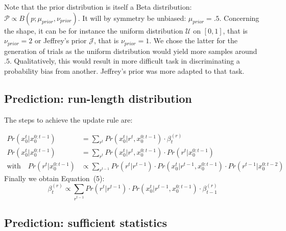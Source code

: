 \documentclass[10pt,letterpaper]{article}
\newcommand{\eq}[1]{\begin{equation*}#1\end{equation*}}
\newcommand{\eqs}[1]{\begin{align*}#1\end{align*}}
\newcommand{\Jj}{\mathcal{J}}
\newcommand{\Pp}{\mathcal{P}}
\newcommand{\Uu}{\mathcal{U}}
\newcommand{\seeEq}[1]{Equation~\ref{eq:#1}}
\begin{document}
%
%

%
%



Note that the prior distribution is itself a Beta distribution:
$\Pp\propto B(p; \mu_{prior}, \nu_{prior})$.
It will by symmetry be unbiased: $\mu_{prior}=.5$.
Concerning the shape, it can be for instance
the uniform distribution $\Uu$ on $ [ 0, 1 ] $, that is $\nu_{prior}=2$ or
Jeffrey's prior $\Jj$, that is $\nu_{prior}=1$.
We chose the latter for the generation of trials
as the uniform distribution would yield more samples around $.5$.
Qualitatively, this would result in more difficult task in discriminating a probability bias from another.
Jeffrey's prior was more adapted to that task.


\subsection{Prediction: run-length distribution}

The steps to achieve the update rule are:

 \eqs{
Pr(x_0^t | x_0^{0:t-1}) &= \sum_{r^{t}} Pr(x_0^t | r^{t}, x_0^{0:t-1}) \cdot  \beta^{(r)}_t \\
Pr(x_0^t | x_0^{0:t-1}) &= \sum_{r^{t}} Pr(x_0^t | r^{t}, x_0^{0:t-1}) \cdot  Pr(r^{t} | x_0^{0:t-1})\\
\text{with} \quad Pr(r^{t} | x_0^{0:t-1}) &\propto \sum_{r^{t-1}}  Pr(r^t | r^{t-1}) \cdot  Pr(x_0^t | r^{t-1}, x_0^{0:t-1}) \cdot  Pr(r^{t-1} | x_0^{0:t-2})
}
Finally we obtain Equation~(5): %
\eq{
\beta^{(r)}_t \propto \sum_{r^{t-1}}  Pr(r^t | r^{t-1}) \cdot  Pr(x_0^t | r^{t-1}, x_0^{0:t-1}) \cdot  \beta^{(r)}_{t-1}
}


\subsection{Prediction: sufficient statistics}
\end{document}
